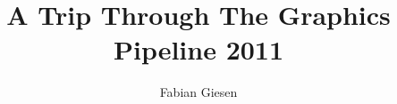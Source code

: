 \documentclass[DIV10]{scrreprt}
\begin{document}


\title{A Trip Through The Graphics Pipeline 2011}
\author{Fabian Giesen}
\maketitle
\tableofcontents



\end{document}

